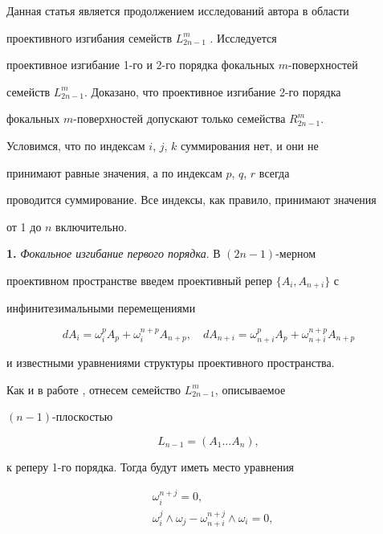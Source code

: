 \label{begin} 


 


 


Данная статья является продолжением исследований автора в области 


проективного изгибания семейств $L^m_{2n-1}$ \cite{1}. Исследуется 


проективное изгибание 1-го и 2-го порядка фокальных $m$-поверхностей 


семейств $L^m_{2n-1}$. Доказано, что проективное изгибание 2-го порядка 


фокальных $m$-поверхностей допускают только семейства $R^m_{2n-1}$. 


 


Условимся, что по индексам $i$, $j$, $k$ суммирования нет, и они не 


принимают равные значения, а по индексам $p$, $q$, $r$ всегда 


проводится суммирование. Все индексы, как правило, принимают значения 


от 1 до $n$ включительно. 


\medskip 


 


{\bf 1.} {\it Фокальное изгибание первого порядка}. В $(2n-1)$-мерном 


проективном пространстве введем проективный репер $\{A_i,A_{n+i}\}$ с 


инфинитезимальными перемещениями 


$$ 


d A_i=\omega^p_i A_p+\omega^{n+p}_i A_{n+p},\quad 


d A_{n+i}=\omega^p_{n+i} A_p+\omega^{n+p}_{n+i}A_{n+p} 


$$ 


и известными уравнениями структуры проективного пространства. 


 


Как и в работе \cite{1}, отнесем семейство $L^m_{2n-1}$, описываемое 


$(n-1)$-плоскостью 


$$ 


L_{n-1}=(A_1\dotsc A_n), 


$$ 


к реперу 1-го порядка. Тогда будут иметь место уравнения  


\begin{align} 


&\omega^{n+j}_i=0, \\ 


&\omega^j_i\wedge\omega_j-\omega^{n+j}_{n+i}\wedge\omega_i=0, 


\end{align} 


